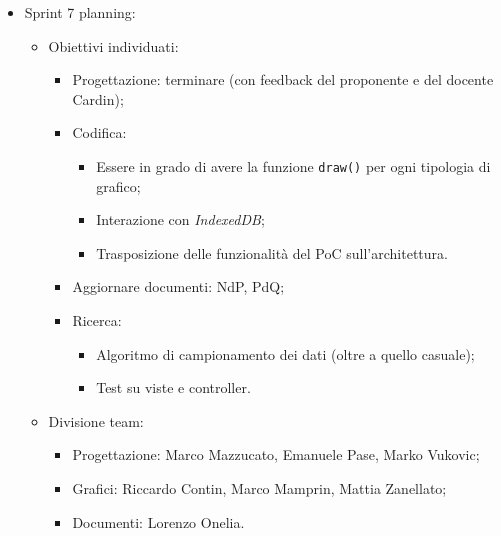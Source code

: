 \begin{itemize}
  \item Sprint 7 planning:
        \begin{itemize}
          \item Obiettivi individuati:
                \begin{itemize}
                  \item Progettazione: terminare (con feedback del proponente e del docente Cardin);
                  \item Codifica:
                        \begin{itemize}
                          \item Essere in grado di avere la funzione \texttt{draw()} per ogni tipologia di grafico;
                          \item Interazione con \textit{IndexedDB};
                          \item Trasposizione delle funzionalità del PoC sull'architettura.
                        \end{itemize}
                  \item Aggiornare documenti: NdP, PdQ;
                  \item Ricerca:
                        \begin{itemize}
                          \item Algoritmo di campionamento dei dati (oltre a quello casuale);
                          \item Test su viste e controller.
                        \end{itemize}
                \end{itemize}
          \item Divisione team:
                \begin{itemize}
                  \item Progettazione: Marco Mazzucato, Emanuele Pase, Marko Vukovic;
                  \item Grafici: Riccardo Contin, Marco Mamprin, Mattia Zanellato;
                  \item Documenti: Lorenzo Onelia.
                \end{itemize}
        \end{itemize}
\end{itemize}